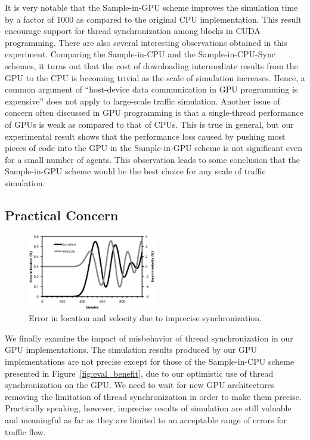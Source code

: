 \documentclass[times, 10pt, twocolumn]{article}
\begin{document}
It is very notable that the Sample-in-GPU scheme improves the simulation
time by a factor of 1000 as compared to the original CPU implementation.
This result encourage support for thread synchronization among blocks in
CUDA programming.
There are also several interesting observations obtained in this
experiment.
Comparing the Sample-in-CPU and the Sample-in-CPU-Sync schemes, it turns
out that the cost of downloading intermediate results from the GPU to
the CPU is becoming trivial as the scale of simulation increases.
Hence, a common argument of ``host-device data communication in GPU
programming is expensive'' does not apply to large-scale traffic
simulation.
Another issue of concern often discussed in GPU programming is that
a single-thread performance of GPUs is weak as compared to that of CPUs.
This is true in general, but our experimental result shows that the
performance loss caused by pushing most pieces of code into the GPU in
the Sample-in-GPU scheme is not significant even for a small number of
agents.
This observation leads to some conclusion that the Sample-in-GPU scheme
would be the best choice for any scale of traffic simulation.

\subsection{Practical Concern}

\begin{figure}[t]
\centering
\includegraphics[width=0.5\textwidth]{eps/eval_error.eps}
\caption{Error in location and velocity due to imprecise synchronization.}
\label{fig:eval_error}
\end{figure}

We finally examine the impact of misbehavior of thread synchronization
in our GPU implementations.
The simulation results produced by our GPU implementations are not
precise except for those of the Sample-in-CPU scheme presented in
Figure~\ref{fig:eval_benefit}, due to our optimistic use of thread
synchronization on the GPU.
We need to wait for new GPU architectures removing the limitation of
thread synchronization in order to make them precise.
Practically speaking, however, imprecise results of simulation are still
valuable and meaningful as far as they are limited to an acceptable
range of errors for traffic flow.
\end{document}
